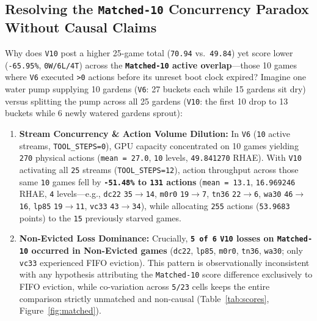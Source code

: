 \documentclass[10pt]{article}
\newcommand{\code}[1]{\texttt{#1}}
\begin{document}
\subsection{Resolving the \code{Matched-10} Concurrency Paradox Without Causal Claims}
Why does \code{V10} post a higher 25-game total (\code{70.94} vs.\ \code{49.84}) yet score lower (\code{-65.95\%}, \code{0W/6L/4T}) across the \textbf{\code{Matched-10} active overlap}---those 10 games where \code{V6} executed \code{>0} actions before its unreset boot clock expired? Imagine one water pump supplying 10 gardens (\code{V6}: 27 buckets each while 15 gardens sit dry) versus splitting the pump across all 25 gardens (\code{V10}: the first 10 drop to 13 buckets while 6 newly watered gardens sprout):
\begin{enumerate}[leftmargin=1.4em,itemsep=2pt]
\item \textbf{Stream Concurrency \& Action Volume Dilution:} In \code{V6} (\code{10} active streams, \code{TOOL\_STEPS=0}), GPU capacity concentrated on 10 games yielding \code{270} physical actions (\code{mean = 27.0}, \code{10} levels, \code{49.841270} RHAE). With \code{V10} activating all \code{25} streams (\code{TOOL\_STEPS=12}), action throughput across those same \code{10} games fell by \textbf{\code{-51.48\%} to \code{131} actions} (\code{mean = 13.1}, \code{16.969246} RHAE, \code{4} levels---e.g., \code{dc22} \code{35$\to$14}, \code{m0r0} \code{19$\to$7}, \code{tn36} \code{22$\to$6}, \code{wa30} \code{46$\to$16}, \code{lp85} \code{19$\to$11}, \code{vc33} \code{43$\to$34}), while allocating \code{255} actions (\code{53.9683} points) to the \code{15} previously starved games.
\item \textbf{Non-Evicted Loss Dominance:} Crucially, \textbf{\code{5 of 6} \code{V10} losses on \code{Matched-10} occurred in Non-Evicted games} (\code{dc22}, \code{lp85}, \code{m0r0}, \code{tn36}, \code{wa30}; only \code{vc33} experienced FIFO eviction). This pattern is observationally inconsistent with any hypothesis attributing the \code{Matched-10} score difference exclusively to FIFO eviction, while co-variation across \code{5/23} cells keeps the entire comparison strictly unmatched and non-causal (Table~\ref{tab:scores}, Figure~\ref{fig:matched}).
\end{enumerate}
\end{document}
